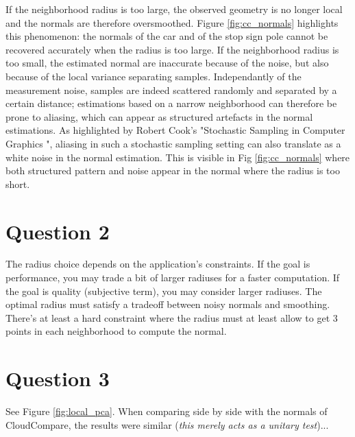 \documentclass[a4paper]{article}
\begin{document}
If the neighborhood radius is too large, the observed geometry is no longer local and the normals are therefore oversmoothed.
Figure \ref{fig:cc_normals} highlights this phenomenon: the normals of the car and of the stop sign pole cannot be recovered accurately when the radius is too large.
If the neighborhood radius is too small, the estimated normal are inaccurate because of the noise, but also because of the local variance separating samples.
Independantly of the measurement noise, samples are indeed scattered randomly and separated by a certain distance; estimations based on a narrow neighborhood can therefore
be prone to aliasing, which can appear as structured artefacts in the normal estimations. As highlighted by Robert Cook's "Stochastic Sampling in Computer Graphics 
", aliasing in such a stochastic sampling setting can also translate as a white noise in the normal estimation. This is visible in Fig \ref{fig:cc_normals} where both structured pattern
and noise appear in the normal where the radius is too short.



\section*{Question 2}
The radius choice depends on the application's constraints. If the goal is performance, you may trade a bit of larger radiuses for a faster computation. If the goal is quality (subjective term), you may consider larger radiuses. The optimal radius must satisfy a tradeoff between noisy normals and smoothing. There's at least a hard constraint where the radius must at least allow to get 3 points in each neighborhood to compute the normal. 

\pagebreak

\section*{Question 3}
See  Figure \ref{fig:local_pca}. When comparing side by side with the normals of CloudCompare, the results were similar (\textit{this merely acts as a unitary test})...
\end{document}
